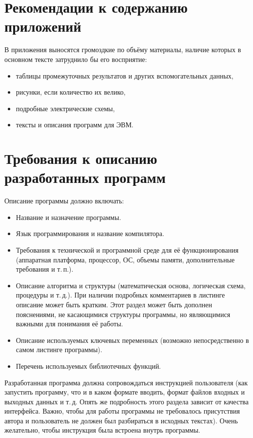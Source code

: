 \documentclass[utf8,14pt, coursreport]{G7-32}
\begin{document}
\section{Рекомендации к содержанию приложений}

В приложения выносятся громоздкие по объёму материалы, наличие которых в основном тексте затруднило бы его восприятие:
\begin{itemize}
\item таблицы промежуточных результатов и других вспомогательных данных,
\item рисунки, если количество их велико,
\item подробные электрические схемы,
\item тексты и описания программ для ЭВМ.
\end{itemize}

\section{Требования к описанию разработанных программ}

Описание программы должно включать:
\begin{itemize}
\item Название и назначение программы.
\item Язык программирования и название компилятора.
\item Требования к технической и программной среде для её функционирования (аппаратная платформа, процессор, ОС, объемы памяти, дополнительные требования и т.\,п.).
\item Описание алгоритма и структуры (математическая основа, логическая схема, процедуры и т.\,д.). При наличии подробных комментариев в листинге описание может быть кратким. Этот раздел может быть дополнен пояснениями, не касающимися структуры программы, но являющимися важными для понимания её работы.
\item Описание используемых ключевых переменных (возможно непосредственно в самом листинге программы).
\item Перечень используемых библиотечных функций.
\end{itemize}

Разработанная программа должна сопровождаться инструкцией пользователя (как запустить программу, что и в каком формате вводить, формат файлов входных и выходных данных и т.\,д. Опять же подробность этого раздела зависит от качества интерфейса. Важно, чтобы для работы программы не требовалось присутствия автора и пользователь не должен был разбираться в исходных текстах). Очень желательно, чтобы инструкция была встроена внутрь программы.
\end{document}
